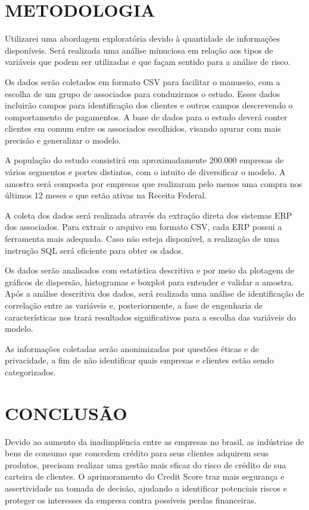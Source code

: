 \documentclass[12pt,a4paper]{article}
\begin{document}
\section{METODOLOGIA}
Utilizarei uma abordagem exploratória devido à quantidade de informações disponíveis. Será realizada uma análise minuciosa em relação aos tipos de variáveis que podem ser utilizadas e que façam sentido para a análise de risco.

Os dados serão coletados em formato CSV para facilitar o manuseio, com a escolha de um grupo de associados para conduzirmos o estudo. Esses dados incluirão campos para identificação dos clientes e outros campos descrevendo o comportamento de pagamentos. A base de dados para o estudo deverá conter clientes em comum entre os associados escolhidos, visando apurar com mais precisão e generalizar o modelo.

A população do estudo consistirá em aproximadamente 200.000 empresas de vários segmentos e portes distintos, com o intuito de diversificar o modelo. A amostra será composta por empresas que realizaram pelo menos uma compra nos últimos 12 meses e que estão ativas na Receita Federal.

A coleta dos dados será realizada através da extração direta dos sistemas ERP dos associados. Para extrair o arquivo em formato CSV, cada ERP possui a ferramenta mais adequada. Caso não esteja disponível, a realização de uma instrução SQL será eficiente para obter os dados.

Os dados serão analisados com estatística descritiva e por meio da plotagem de gráficos de dispersão, histogramas e boxplot para entender e validar a amostra. Após a análise descritiva dos dados, será realizada uma análise de identificação de correlação entre as variáveis e, posteriormente, a fase de engenharia de características nos trará resultados significativos para a escolha das variáveis do modelo.

As informações coletadas serão anonimizadas por questões éticas e de privacidade, a fim de não identificar quais empresas e clientes estão sendo categorizados.
\section{CONCLUSÃO}
Devido ao aumento da inadimplência entre as empresas no brasil, as indústrias de bens de consumo que concedem crédito para seus clientes adquirem seus produtos, precisam realizar uma gestão mais eficaz do risco de crédito de sua carteira de clientes. O aprimoramento do Credit Score traz mais segurança e assertividade na tomada de decisão, ajudando a identificar potenciais riscos e proteger os interesses da empresa contra possíveis perdas financeiras.
\end{document}

